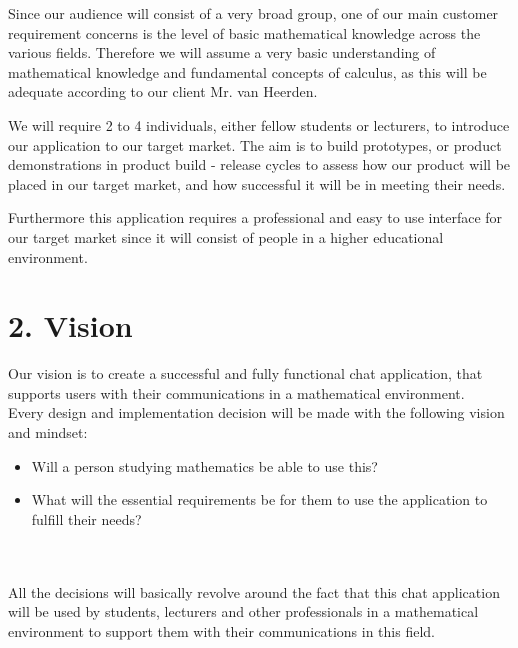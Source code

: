 \documentclass[29pt,a4paper]{moderncv}
\begin{document}
			\parindent 5mm Since our audience will consist of a very broad group, one of our main customer requirement concerns is the level of basic mathematical knowledge across the various fields. Therefore we will assume a very basic understanding of mathematical knowledge and fundamental concepts of calculus, as this will be adequate according to our client Mr. van Heerden.
			
			\parindent 5mm We will require 2 to 4 individuals, either fellow students or lecturers, to introduce our application to our target market. The aim is to build prototypes, or product demonstrations in product  build - release cycles to assess how our product will be placed in our target market, and how successful it will be in meeting their needs.
			
			\parindent 5mm Furthermore this application requires a professional and easy to use interface for our target market since it will consist of people in a higher educational environment.
		\vspace{5mm}
	
\newpage
	\noindent\section*{\textbf{2. Vision}}
	\vspace{4mm}
		\noindent Our vision is to create a successful and fully functional chat application, that supports users with their communications in a mathematical environment.
\newline
		\\Every design and implementation decision will be made with the following vision and mindset:
		\begin{itemize}
			\item Will a person studying mathematics be able to use this?
			\item What will the essential requirements be for them to use the application to fulfill their needs?\\
		\end{itemize}\\
		
\\\newline
		\noindent All the decisions will basically revolve around the fact that this chat application will be used by students, lecturers and other professionals in a mathematical environment to support them with their communications in this field.
	\vspace{5mm}
	
\end{document}
